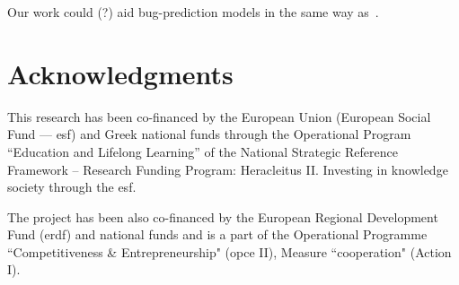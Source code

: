 \documentclass[conference]{llncs}
\begin{document}
Our work could (?) aid bug-prediction models in the same way as~\cite{BN11}.

\section*{Acknowledgments}

This research has been co-financed by the European Union (European Social Fund
--– {\sc esf}) and Greek national funds through the Operational Program
``Education and Lifelong Learning'' of the National Strategic Reference Framework –
Research Funding Program: Heracleitus II. Investing in knowledge society
through the {\sc esf}.

The project has been also co-financed by the European Regional Development Fund ({\sc erdf})
and national funds and is a part of the Operational Programme ``Competitiveness \&
Entrepreneurship" ({\sc opce} II), Measure ``{\sc cooperation}" (Action I).


 
\end{document}
